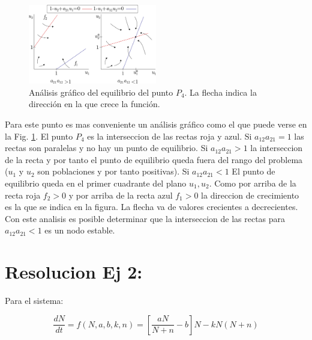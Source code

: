 \documentclass[twocolumn,aps,prl]{revtex4-1}
\begin{document}

\begin{figure}
    \centering
    \includegraphics[width=0.5\textwidth]{figuras/equilibrio.pdf}
    \caption{Análisis gráfico del equilibrio del punto $P_4$. La flecha indica la dirección en la que crece la función.}
    \label{fig:mosquitos}
\end{figure}


Para este punto es mas conveniente un análisis gráfico como el que puede verse en la Fig. \ref{fig:mosquitos}. El punto $P_4$ es la interseccion de las rectas roja y azul. Si $a_{12} a_{21} = 1$ las rectas son paralelas y no hay un punto de equilibrio. Si $a_{12} a_{21} > 1$ la interseccion de la recta y por tanto el punto de equilibrio queda fuera del rango del problema ($u_1$ y $u_2$ son poblaciones y por tanto positivas). Si $a_{12} a_{21} < 1$ El punto de equilibrio queda en el primer cuadrante del plano $u_1, u_2$. Como por arriba de la recta roja $f_2>0$ y por arriba de la recta azul $f_1>0$ la direccion de crecimiento es la que se indica en la figura. La flecha va de valores crecientes a decrecientes. Con este analisis es posible determinar que la interseccion de las rectas para $a_{12} a_{21} < 1$ es un nodo estable.

% 

\section{Resolucion Ej 2:}

Para el sistema:

\begin{equation}\label{eq:esteril1}
    \frac{d N}{d t} = f(N,a,b,k,n) 
    = \left[\frac{a N}{N+n}-b\right] N- k N(N+n)
\end{equation}
\end{document}
